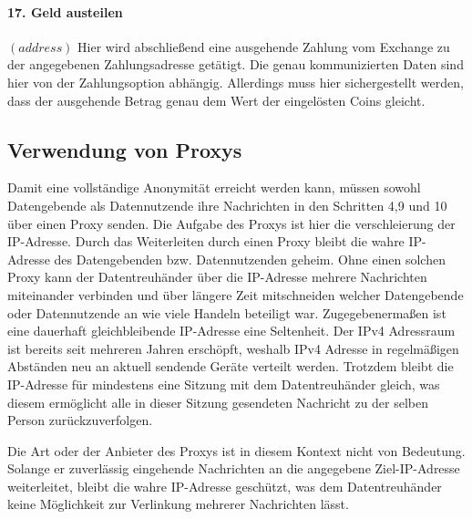 \documentclass{scrreprt}
\begin{document}
\paragraph{17. Geld austeilen} $(address)$
Hier wird abschließend eine ausgehende Zahlung vom Exchange zu der angegebenen Zahlungsadresse getätigt. Die genau kommunizierten Daten sind hier von der Zahlungsoption abhängig. Allerdings muss hier sichergestellt werden, dass der ausgehende Betrag genau dem Wert der eingelösten Coins gleicht.

\subsection{Verwendung von Proxys}
Damit eine vollständige Anonymität erreicht werden kann, müssen sowohl Datengebende als Datennutzende ihre Nachrichten in den Schritten 4,9 und 10 über einen Proxy senden. Die Aufgabe des Proxys ist hier die verschleierung der IP-Adresse. Durch das Weiterleiten durch einen Proxy bleibt die wahre IP-Adresse des Datengebenden bzw. Datennutzenden geheim. Ohne einen solchen Proxy kann der Datentreuhänder über die IP-Adresse mehrere Nachrichten miteinander verbinden und über längere Zeit mitschneiden welcher Datengebende oder Datennutzende an wie viele Handeln beteiligt war. Zugegebenermaßen ist eine dauerhaft gleichbleibende IP-Adresse eine Seltenheit. Der IPv4 Adressraum ist bereits seit mehreren Jahren erschöpft, weshalb IPv4 Adresse in regelmäßigen Abständen neu an aktuell sendende Geräte verteilt werden. Trotzdem bleibt die IP-Adresse für mindestens eine Sitzung mit dem Datentreuhänder gleich, was diesem ermöglicht alle in dieser Sitzung gesendeten Nachricht zu der selben Person zurückzuverfolgen. 

Die Art oder der Anbieter des Proxys ist in diesem Kontext nicht von Bedeutung. Solange er zuverlässig eingehende Nachrichten an die angegebene Ziel-IP-Adresse weiterleitet, bleibt die wahre IP-Adresse geschützt, was dem Datentreuhänder keine Möglichkeit zur Verlinkung mehrerer Nachrichten lässt.
\end{document}
